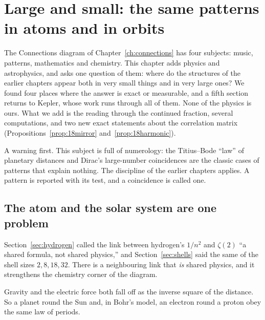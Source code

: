 \chapter{Large and small: the same patterns in atoms and in orbits}\label{ch:large-small}

\addednote{\revD}

The Connections diagram of Chapter~\ref{ch:connections} has four subjects: music, patterns, mathematics and chemistry. This
chapter adds physics and astrophysics, and asks one question of them: where do the structures of the
earlier chapters appear both in very small things and in very large ones? We found four places where the
answer is exact or measurable, and a fifth section returns to Kepler, whose work runs through all of them.
None of the physics is ours. What we add is the reading through the continued fraction, several
computations, and two new exact statements about the correlation matrix
(Propositions~\ref{prop:18mirror} and~\ref{prop:18harmonic}).

A warning first. This subject is full of numerology: the Titius--Bode ``law'' of planetary distances and
Dirac's large-number coincidences are the classic cases of patterns that explain nothing. The discipline
of the earlier chapters applies. A pattern is reported with its test, and a coincidence is called one.

\section{The atom and the solar system are one problem}\label{sec:18kepler}

Section~\ref{sec:hydrogen} called the link between hydrogen's $1/n^{2}$ and $\zeta(2)$ ``a shared formula, not shared
physics,'' and Section~\ref{sec:shells} said the same of the shell sizes $2,8,18,32$. There is a neighbouring link
that \emph{is} shared physics, and it strengthens the chemistry corner of the diagram.

Gravity and the electric force both fall off as the inverse square of the distance. So a planet round the
Sun and, in Bohr's model, an electron round a proton obey the same law of periods.

